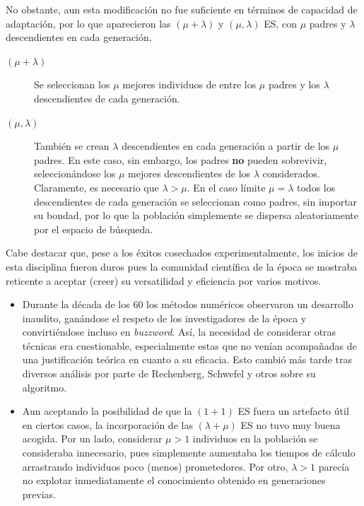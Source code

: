 \documentclass[12pt]{article} \usepackage[utf8x]{inputenc}
\begin{document}
No obstante, aun esta modificación no fue suficiente en términos de
capacidad de adaptación, por lo que aparecieron las $(\mu + \lambda)$
y $(\mu, \lambda)$ ES, con $\mu$ padres y $\lambda$ descendientes en
cada generación. \\

\begin{description}
\item[$(\mu + \lambda)$] Se seleccionan los $\mu$
mejores individuos de entre los $\mu$ padres y los $\lambda$
descendientes de cada generación.
\item[$(\mu, \lambda)$] También se crean $\lambda$ descendientes en
  cada generación a partir de los $\mu$ padres. En este caso, sin
  embargo, los padres \textbf{no} pueden sobrevivir, seleccionándose
  los $\mu$ mejores descendientes de los $\lambda$
  considerados. Claramente, es necesario que $\lambda > \mu$. En el
  caso límite $\mu = \lambda$ todos los descendientes de cada
  generación se seleccionan como padres, sin importar su bondad, por
  lo que la población simplemente se dispersa aleatoriamente por el
  espacio de búsqueda.
\end{description}

Cabe destacar que, pese a los éxitos cosechados experimentalmente, los
inicios de esta disciplina fueron duros pues la comunidad científica
de la época se mostraba reticente a aceptar (creer) su versatilidad y
eficiencia por varios motivos.

\begin{itemize}
\item Durante la década de los 60 los métodos numéricos observaron un
  desarrollo inaudito, ganándose el respeto de los investigadores de
  la época y convirtiéndose incluso en \textit{buzzword}. Así, la
  necesidad de considerar otras técnicas era cuestionable,
  especialmente estas que no venían acompañadas de una justificación
  teórica en cuanto a su eficacia. Esto cambió más tarde tras diversos
  análisis por parte de Rechenberg, Schwefel y otros sobre su
  algoritmo.
\item Aun aceptando la posibilidad de que la $(1 + 1)$ ES fuera un
  artefacto útil en ciertos casos, la incorporación de las $(\lambda +
  \mu)$ ES no tuvo muy buena acogida. Por un lado, considerar $\mu >
  1$ individuos en la población se consideraba innecesario, pues
  simplemente aumentaba los tiempos de cálculo arrastrando individuos
  poco (menos) prometedores. Por otro, $\lambda > 1$ parecía no
  explotar inmediatamente el conocimiento obtenido en generaciones previas.
\end{itemize}
\end{document}
